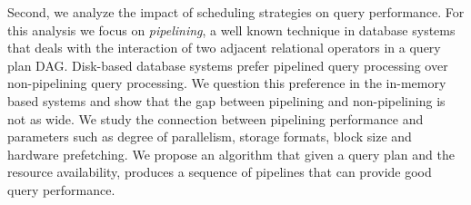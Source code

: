Second, we analyze the impact of scheduling strategies on query performance.
For this analysis we focus on \textit{pipelining}, a well known technique in database systems that deals with the interaction of two adjacent relational operators in a query plan DAG. 
Disk-based database systems prefer pipelined query processing over non-pipelining query processing.
We question this preference in the in-memory based systems and show that the gap between pipelining and non-pipelining is not as wide.
We study the connection between pipelining performance and parameters such as degree of parallelism, storage formats, block size and hardware prefetching.
We propose an algorithm that given a query plan and the resource availability, produces a sequence of pipelines that can provide good query performance.
